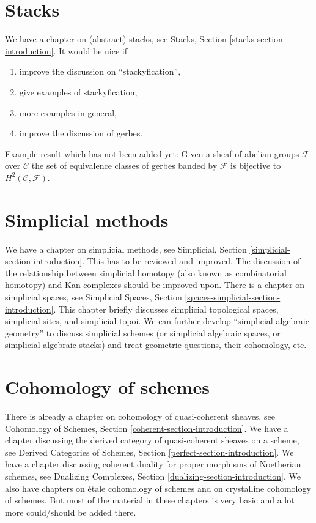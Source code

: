 \section{Stacks}
\label{section-stacks}

\noindent
We have a chapter on (abstract) stacks, see
Stacks, Section \ref{stacks-section-introduction}.
It would be nice if
\begin{enumerate}
\item improve the discussion on ``stackyfication'',
\item give examples of stackyfication,
\item more examples in general,
\item improve the discussion of gerbes.
\end{enumerate}
Example result which has not been added yet: Given a sheaf of abelian
groups $\mathcal{F}$
over $\mathcal{C}$ the set of equivalence classes of gerbes banded by
$\mathcal{F}$ is bijective to $H^2(\mathcal{C}, \mathcal{F})$.


\section{Simplicial methods}
\label{section-simplicial}

\noindent
We have a chapter on simplicial methods, see
Simplicial, Section \ref{simplicial-section-introduction}.
This has to be reviewed and improved. The discussion of
the relationship between simplicial homotopy (also known as
combinatorial homotopy) and Kan complexes should be improved upon.
There is a chapter on simplicial spaces, see
Simplicial Spaces, Section \ref{spaces-simplicial-section-introduction}.
This chapter briefly discusses
simplicial topological spaces, simplicial sites, and simplicial topoi.
We can further develop ``simplicial algebraic geometry'' to discuss
simplicial schemes (or simplicial algebraic spaces, or
simplicial algebraic stacks) and treat geometric questions, their cohomology,
etc.


\section{Cohomology of schemes}
\label{section-schemes-cohomology}

\noindent
There is already a chapter on cohomology of quasi-coherent sheaves, see
Cohomology of Schemes, Section \ref{coherent-section-introduction}.
We have a chapter discussing the derived category of
quasi-coherent sheaves on a scheme, see
Derived Categories of Schemes, Section \ref{perfect-section-introduction}.
We have a chapter discussing coherent duality for proper morphisms
of Noetherian schemes, see
Dualizing Complexes, Section \ref{dualizing-section-introduction}.
We also have chapters on \'etale cohomology of schemes and on
crystalline cohomology of schemes. But most of the material in these
chapters is very basic and a lot more could/should be added there.


